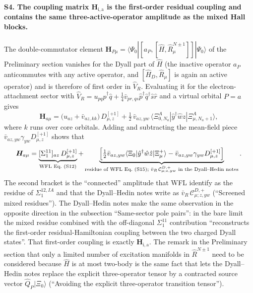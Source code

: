 \documentclass[11pt,a4paper]{article}
\newcommand{\bH}{\boldsymbol{H}}
\newcommand{\ket}[1]{|#1\rangle}
\newcommand{\braket}[1]{\langle#1\rangle}
\newcommand{\WFL}{WFL}
\newcommand{\Pre}{Preliminary section}
\newcommand{\DHN}{Dyall--Hedin notes}
\begin{document}
\paragraph{S4. The coupling matrix $\bH_{\mathrm{i,a}}$ is the first-order
residual coupling and contains the same three-active-operator amplitude as the
mixed Hall blocks.}
The double-commutator element
$\bH_{P\mu}=\braket{\Psi_0|[a_P,[\hat H,\hat R^{N\pm1}_\mu]]|\Psi_0}$ of the
\Pre{} vanishes for the Dyall part of $\hat H$ (the inactive operator $a_P$
anticommutes with any active operator, and $[\hat H_D,\hat R_\mu]$ is again an
active operator) and is therefore of first order in $\hat V_R$.  Evaluating it
for the electron-attachment sector with $\hat V_R=u_{pq}\hat p^\dagger\hat q+\tfrac14\bar v_{pr,qs}\hat p^\dagger\hat q^\dagger\hat s\hat r$
and a virtual orbital $P=a$ gives
\begin{equation}
  \bH_{a\mu}
  =
  \bigl(u_{az}+\bar v_{az,kk}\bigr)\,D^{[+1]}_{\mu,z}
  +
  \tfrac12\,\bar v_{az,yw}\,
  \braket{\Xi^A_{0,N_a}|\hat y^\dagger\hat w\hat z|\Xi^A_{\mu,N_a+1}} ,
  \label{eq:H-ia-explicit}
\end{equation}
where $k$ runs over core orbitals.  Adding and subtracting the mean-field
piece $\bar v_{az,yw}\gamma_{yw}D^{[+1]}_{\mu,z}$ shows that
\begin{equation}
  \bH_{a\mu}
  =
  \underbrace{[\Sigma_1^{11}]_{az}\,D^{[+1]}_{\mu,z}}_{\text{\WFL{} Eq.~(S12)}}
  +
  \underbrace{\Bigl[\tfrac12\bar v_{az,yw}\braket{\Xi_0|\hat y^\dagger\hat w\hat z|\Xi_\mu^{+}}
  -\bar v_{az,yw}\gamma_{yw}D^{[+1]}_{\mu,z}\Bigr]}_{\text{residue of \WFL{} Eq.~(S15); }\bar v_R\,\mathcal C^{D,+}_{\mu;z,yw}\text{ in the \DHN}} .
  \label{eq:H-ia-split}
\end{equation}
The second bracket is the ``connected'' amplitude that \WFL{} identify as the
residue of $\Sigma_1^{12,IA}$ and that the \DHN{} write as
$\bar v_R\,\mathcal C^{D,+}_{\mu;z,yw}$ (``Screened mixed residues'').  The
\DHN{} make the same observation in the opposite direction in the subsection
``Same-sector pole pairs'': in the bare limit the mixed residue combined with the
off-diagonal $\Sigma_1^{11}$ contribution ``reconstructs the first-order
residual-Hamiltonian coupling between the two charged Dyall states''.  That
first-order coupling is exactly $\bH_{\mathrm{i,a}}$.  The remark in the \Pre{}
that only a limited number of excitation manifolds in $\hat R^{N\pm1}$ need to
be considered because $\hat H$ is at most two-body is the same fact that lets
the \DHN{} replace the explicit three-operator tensor by a contracted source
vector $\hat Q_P\ket{\Xi_0}$ (``Avoiding the explicit three-operator transition
tensor'').
\end{document}

